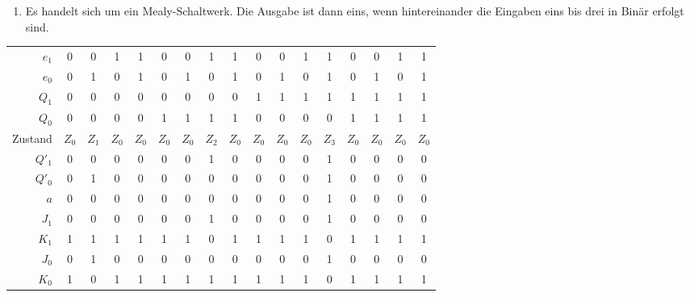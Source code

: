 \documentclass[a4paper, 12pt, margins=2cm]{homework}
\begin{document}
  \begin{problem}
  \end{problem}
  \begin{solution} \hfill
    \begin{enumerate}[label=(\alph*)]\itemsep0pt
      \item Es handelt sich um ein Mealy-Schaltwerk. Die Ausgabe ist dann eins,
            wenn hintereinander die Eingaben eins bis drei in Binär erfolgt sind.
    \end{enumerate}
    \begin{center}
      \begin{tabular}{r|cccc|cccc|cccc|cccc}
        $e_1$   & 0     & 0     & 1     & 1     & 0     & 0     & 1     & 1     & 0     & 0     & 1     & 1     & 0     & 0     & 1     & 1     \\
        $e_0$   & 0     & 1     & 0     & 1     & 0     & 1     & 0     & 1     & 0     & 1     & 0     & 1     & 0     & 1     & 0     & 1     \\
        $Q_1$   & 0     & 0     & 0     & 0     & 0     & 0     & 0     & 0     & 1     & 1     & 1     & 1     & 1     & 1     & 1     & 1     \\
        $Q_0$   & 0     & 0     & 0     & 0     & 1     & 1     & 1     & 1     & 0     & 0     & 0     & 0     & 1     & 1     & 1     & 1     \\ \hline
        Zustand & $Z_0$ & $Z_1$ & $Z_0$ & $Z_0$ & $Z_0$ & $Z_0$ & $Z_2$ & $Z_0$ & $Z_0$ & $Z_0$ & $Z_0$ & $Z_3$ & $Z_0$ & $Z_0$ & $Z_0$ & $Z_0$ \\ \hline
        $Q'_1$  & 0     & 0     & 0     & 0     & 0     & 0     & 1     & 0     & 0     & 0     & 0     & 1     & 0     & 0     & 0     & 0     \\
        $Q'_0$  & 0     & 1     & 0     & 0     & 0     & 0     & 0     & 0     & 0     & 0     & 0     & 1     & 0     & 0     & 0     & 0     \\ \hline
        $a$     & 0     & 0     & 0     & 0     & 0     & 0     & 0     & 0     & 0     & 0     & 0     & 1     & 0     & 0     & 0     & 0     \\ \hline
        $J_1$   & 0     & 0     & 0     & 0     & 0     & 0     & 1     & 0     & 0     & 0     & 0     & 1     & 0     & 0     & 0     & 0     \\
        $K_1$   & 1     & 1     & 1     & 1     & 1     & 1     & 0     & 1     & 1     & 1     & 1     & 0     & 1     & 1     & 1     & 1     \\
        $J_0$   & 0     & 1     & 0     & 0     & 0     & 0     & 0     & 0     & 0     & 0     & 0     & 1     & 0     & 0     & 0     & 0     \\
        $K_0$   & 1     & 0     & 1     & 1     & 1     & 1     & 1     & 1     & 1     & 1     & 1     & 0     & 1     & 1     & 1     & 1    
        \end{tabular}
    \end{center}
  \end{solution}
\end{document}
